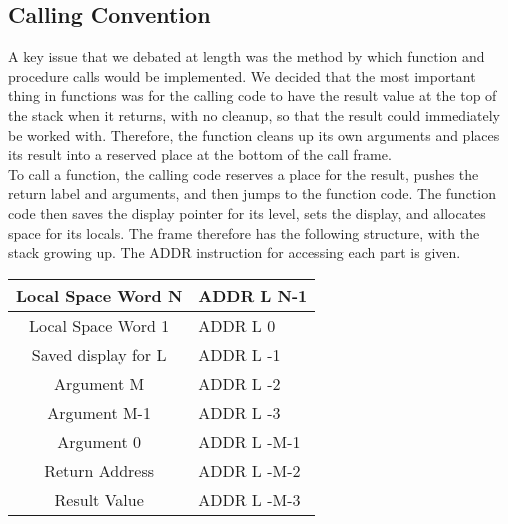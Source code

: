 \documentclass[oneside]{amsart}
\theoremstyle{definition}
\theoremstyle{remark}
\numberwithin{equation}{section}
\begin{document}
\subsection{Calling Convention}
A key issue that we debated at length was the method by which function and procedure calls would
be implemented. We decided that the most important thing in functions was for the calling code 
to have the result value at the top of the stack when it returns, with no cleanup, so that the result
could immediately be worked with. Therefore, the function cleans up its own arguments and places
its result into a reserved place at the bottom of the call frame.\\
To call a function, the calling code reserves a place for the result, pushes the return label and
arguments, and then jumps to the function code. The function code then saves the display pointer for 
its level, sets the display, and allocates space for its locals. The frame therefore has the following 
structure, with the stack growing up. The ADDR instruction for accessing each part is given.\\
\begin{tabular}{c|l}
Local Space Word N & ADDR L N-1 \\
\hline
Local Space Word 1 & ADDR L 0 \\
Saved display for L & ADDR L -1 \\
Argument M & ADDR L -2 \\
Argument M-1 & ADDR L -3 \\
\hline
Argument 0 & ADDR L -M-1  \\
Return Address & ADDR L -M-2  \\
Result Value & ADDR L -M-3  \\
\end{tabular}

\end{document}
